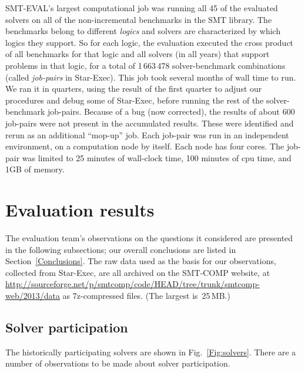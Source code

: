 \documentclass{eptcs}
\begin{document}
SMT-EVAL's largest computational job was running all 45 of the evaluated solvers on all of the non-incremental benchmarks in the SMT library. The benchmarks belong to different {\em logics} and solvers are characterized by which logics they support. So for each logic, the evaluation executed the cross product of all benchmarks for that logic and all solvers (in all years) that support problems in that logic, for a total of 1\,663\,478 solver-benchmark combinations (called {\em job-pairs} in Star-Exec). This job took several months of wall time to run. We ran it in quarters, using the result of the first quarter to adjust our procedures and debug some of Star-Exec, before running the rest of the solver-benchmark job-pairs. Because of a bug (now corrected), the results of about 600 job-pairs were not present in the accumulated results. These were identified and rerun as an additional ``mop-up'' job. Each job-pair was run in an independent environment, on a computation node by itself. Each node has four cores. The job-pair was limited to 25 minutes of wall-clock time, 100 minutes of cpu time, and 1GB of memory.

\section{Evaluation results}
\label{Evaluations}

The evaluation team's observations on the questions it considered are presented in the following subsections; our overall conclusions are listed in Section~\ref{Conclusions}.  The raw data used as the basis for our observations, collected from Star-Exec, are all archived on the SMT-COMP website, at \url{http://sourceforge.net/p/smtcomp/code/HEAD/tree/trunk/smtcomp-web/2013/data} as 7z-compressed files.  (The largest is~25\,MB.)

\subsection{Solver participation}
\label{Solvers}

The historically participating solvers are shown in Fig.~\ref{Fig:solvers}. There are a number of observations to be made about solver participation.
   
\end{document}
